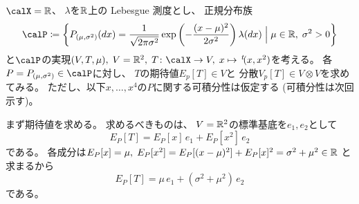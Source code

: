 \documentclass[report]{jlreq}
\begin{document}
\begin{example}
    $\calX = \R$、
    $\lambda$を$\mathbb{R}$上の Lebesgue 測度とし、
    正規分布族
    \begin{equation}
        \calP \coloneqq \mybrace{
            P_{(\mu, \sigma^2)}(dx)
                = \frac{1}{\sqrt{2\pi\sigma^2}} \exp\myparen{
                    -\frac{(x - \mu)^2}{2\sigma^2}
                } \lambda(dx)
            \;\Big|\;
            \mu \in \R, \; \sigma^2 > 0
        }
    \end{equation}
    と$\calP$の実現$(V, T, \mu), \;
        V = \R^2, \;
        T \colon \calX \to V, \;
        x \mapsto \up{t}(x, x^2)$を考える。
    各$P = P_{(\mu, \sigma^2)} \in \calP$に対し、
    $T$の期待値$E_p[T] \in V$と
    分散$V_p[T] \in V \otimes V$を求めてみる。
    ただし、以下$x, \dots, x^4$の$P$に関する可積分性は仮定する
    (可積分性は次回示す)。

    まず期待値を求める。
    求めるべきものは、
    $V = \mathbb{R}^2$の標準基底を$e_1, e_2$として
    \begin{equation}
        E_P[T]
            = E_P[x] \, e_1 + E_P[x^2] \, e_2
    \end{equation}
    である。
    各成分は$E_P[x] = \mu, \;
        E_P[x^2]
            = E_P[(x - \mu)^2] + E_P[x]^2
            = \sigma^2 + \mu^2 \in \mathbb{R}$
    と求まるから
    \begin{equation}
        E_P[T]
            = \mu \, e_1 + (\sigma^2 + \mu^2) \, e_2
    \end{equation}
    である。


\end{example}
\end{document}
